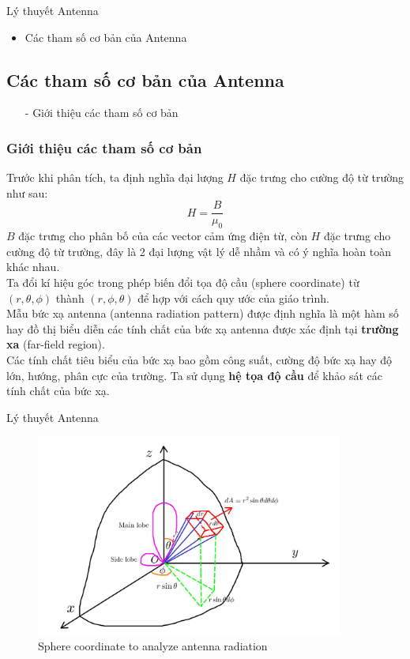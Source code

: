 \documentclass[8pt]{beamer}
\begin{document}
\begin{frame}{Lý thuyết Antenna}
\begin{itemize}
	\item Các tham số cơ bản của Antenna
\end{itemize}
\subsection{Các tham số cơ bản của Antenna}
\begin{itemize}
	\item[-] Giới thiệu các tham số cơ bản
\end{itemize}
\subsubsection{Giới thiệu các tham số cơ bản}
Trước khi phân tích, ta định nghĩa đại lượng $H$ đặc trưng cho cường độ từ trường như sau: $$H=\frac{B}{\mu_{0}}$$
$B$ đặc trưng cho \alert{phân bố của các vector cảm ứng điện từ}, còn $H$ đặc trưng cho \alert{cường độ từ trường}, đây là 2 đại lượng vật lý dễ nhầm và có ý nghĩa hoàn toàn khác nhau.
\\ Ta đổi kí hiệu góc trong phép biến đổi tọa độ cầu (sphere coordinate) từ $(r,\theta,\phi)$ thành $(r,\phi,\theta)$ để hợp với cách quy ước của giáo trình.
\\ Mẫu bức xạ antenna (antenna radiation pattern) được định nghĩa là một hàm số hay đồ thị biểu diễn các tính chất của bức xạ antenna được xác định tại \alert{\textbf{trường xa}} (far-field region). \\Các tính chất tiêu biểu của bức xạ bao gồm công suất, cường độ bức xạ hay độ lớn, hướng, phân cực của trường. Ta sử dụng \alert{\textbf{hệ tọa độ cầu}} để khảo sát các tính chất của bức xạ.
\end{frame}
\begin{frame}{Lý thuyết Antenna}
\begin{figure}[h]
			\includegraphics[width=0.9\textwidth]{sphere.jpg}
			\caption{Sphere coordinate to analyze antenna radiation}			\label{fig:re7}
\end{figure}

\end{frame}
\end{document}
